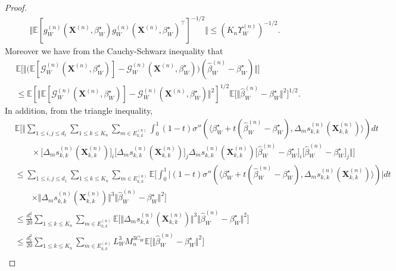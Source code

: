 \documentclass{article}
\begin{document}
\begin{proof}
 \begin{align} \label{weylbound}
     \Vert \mathbb{E}[g_W^{(n)}(\mathbf{X}^{(n)},\beta_W^{\star})g_W^{(n)}(\mathbf{X}^{(n)},\beta_W^{\star})^{\top}]^{-1/2} \Vert \leq {( K_n\Upsilon_W^{(n)})^{-1/2}}.
\end{align}
Moreover we have from the Cauchy-Schwarz inequality that
\begin{align*}
    &\mathbb{E}\big[ \Vert \big( \mathbb{E}[\mathcal{G}_W^{(n)}(\mathbf{X}^{(n)},\beta_W^{\star})] -\mathcal{G}_W^{(n)}(\mathbf{X}^{(n)},\beta_W^{\star})  \big)(\hat{\beta}_W^{(n)} - \beta_W^{\star}) \Vert \big] \\
    & \leq \mathbb{E}[ \Vert  \mathbb{E}[\mathcal{G}_W^{(n)}(\mathbf{X}^{(n)},\beta_W^{\star})] -\mathcal{G}_W^{(n)}(\mathbf{X}^{(n)},\beta_W^{\star}) \Vert^2 ]^{1/2} \mathbb{E}\big[ \Vert \hat{\beta}_W^{(n)} - \beta_W^{\star} \Vert^2 ]^{1/2}.
\end{align*} 
In addition, from the triangle inequality,
\begin{align*}
    &\mathbb{E}\bigg[\bigg\Vert \sum_{1 \leq i,j \leq d_1} \sum_{1\leq k \leq K_n} \sum_{m \in E_{k,k}^{(n)}} \int_0^1 (1-t) \sigma'' ( \langle \beta_W^{\star} + t(\hat{\beta}_W^{(n)} - \beta_W^{\star}) , \Delta_m s_{k,k}^{(n)}(\mathbf{X}_{k,k}^{(n)}) \rangle )dt  \\
    & \qquad \times \big[\Delta_m s_{k,k}^{(n)}(\mathbf{X}_{k,k}^{(n)}) \big]_i \big[\Delta_m s_{k,k}^{(n)}(\mathbf{X}_{k,k}^{(n)}) \big]_j \Delta_m s_{k,k}^{(n)}(\mathbf{X}_{k,k}^{(n)})  \big[ \hat{\beta}_W^{(n)}-\beta_W^{\star}\big]_i \big[ \hat{\beta}_W^{(n)}-\beta_W^{\star}\big]_j  \bigg\Vert \bigg] \\
    & \leq  \sum_{1 \leq i,j \leq d_1} \sum_{1\leq k \leq K_n} \sum_{m \in E_{k,k}^{(n)}}  \mathbb{E} \bigg[  \int_0^1 \vert (1-t) \sigma'' ( \langle \beta_W^{\star} + t(\hat{\beta}_W^{(n)} - \beta_W^{\star}) , \Delta_m s_{k,k}^{(n)}(\mathbf{X}_{k,k}^{(n)}) \rangle )  \vert dt \\
    & \qquad \times \Vert \Delta_m s_{k,k}^{(n)}(\mathbf{X}_{k,k}^{(n)}) \Vert^3 \Vert \hat{\beta}_W^{(n)}-\beta_W^{\star}\Vert^2   \bigg] \\
    & \leq  \frac{d_1^2}{20}  \sum_{1\leq k \leq K_n} \sum_{m \in E_{k,k}^{(n)}}  \mathbb{E}\big[  \Vert \Delta_m s_{k,k}^{(n)}(\mathbf{X}_{k,k}^{(n)}) \Vert^3 \Vert \hat{\beta}_W^{(n)}-\beta_W^{\star}\Vert^2 \big] \\
    & \leq  \frac{d_1^2}{20}  \sum_{1\leq k \leq K_n} \sum_{m \in E_{k,k}^{(n)}}  L_W^3 M_n^{3C_W} \mathbb{E}\big[ \Vert \hat{\beta}_W^{(n)}-\beta_W^{\star}\Vert^2 \big] \\

\end{align*}
\end{proof}
\end{document}
